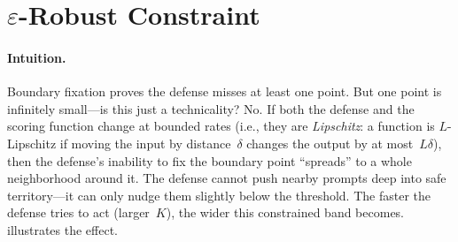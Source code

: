 \documentclass[11pt]{article}
\begin{document}
\section{$\varepsilon$-Robust Constraint}
\label{sec:eps-robust}

\paragraph{Intuition.}
Boundary fixation proves the defense misses at least one point. But
one point is infinitely small---is this just a technicality? No. If
both the defense and the scoring function change at bounded rates
(i.e., they are \emph{Lipschitz}: a function is $L$-Lipschitz if
moving the input by distance~$\delta$ changes the output by at
most~$L\delta$), then the defense's inability to fix the boundary
point ``spreads'' to a whole neighborhood around it. The defense
cannot push nearby prompts deep into safe territory---it can only
nudge them slightly below the threshold. The faster the defense tries
to act (larger~$K$), the wider this constrained band becomes.
 illustrates the effect.
\end{document}

